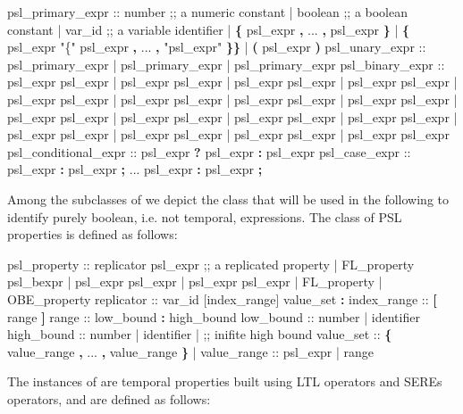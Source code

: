 \begin{Grammar}
psl_primary_expr ::
   number                              ;; a numeric constant
 | boolean                             ;; a boolean constant
 | var_id                              ;; a variable identifier
 | \textbf{\{} psl_expr \textbf{,} ... \textbf{,} psl_expr \textbf{\}}
 | \textbf{\{} psl_expr "\{" psl_expr \textbf{,} ... \textbf{,} "psl_expr" \textbf{\}}\textbf{\}}
 | \textbf{(} psl_expr \textbf{)}
psl_unary_expr ::
   \operator{+} psl_primary_expr     
 | \operator{-} psl_primary_expr  
 | \operator{!} psl_primary_expr  
psl_binary_expr ::
   psl_expr \operator{+} psl_expr    
 | psl_expr  psl_expr 
 | psl_expr  psl_expr 
 | psl_expr \operator{-} psl_expr   
 | psl_expr \operator{*}psl_expr   
 | psl_expr \operator{/} psl_expr   
 | psl_expr \operator{\%} psl_expr 
 | psl_expr \operator{==} psl_expr    
 | psl_expr \operator{!=} psl_expr  
 | psl_expr \operator{<} psl_expr       
 | psl_expr \operator{<=} psl_expr       
 | psl_expr \operator{>} psl_expr       
 | psl_expr \operator{>=} psl_expr       
 | psl_expr \operator{&} psl_expr 
 | psl_expr \operator{|} psl_expr 
 | psl_expr  psl_expr 
psl_conditional_expr ::
 psl_expr \textbf{?} psl_expr \textbf{:} psl_expr 
psl_case_expr ::
     psl_expr \textbf{:} psl_expr \textbf{;}
     ...
     psl_expr \textbf{:} psl_expr \textbf{;}
\end{Grammar}
%
Among the subclasses of  we depict the class
 that will be used in the following to identify purely
boolean, i.e. not temporal, expressions. The class of PSL properties
 is defined as follows:
%
\begin{Grammar}
psl_property :: 
   replicator psl_expr ;; a replicated property 
 | FL_property  psl_bexpr
 | psl_expr \operator{<->} psl_expr
 | psl_expr \operator{->} psl_expr
 | FL_property       
 | OBE_property      
replicator :: 
    var_id [index_range]  value_set \textbf{:} 
index_range :: 
   \textbf{[} range \textbf{]} 
range :: 
   low_bound \textbf{:} high_bound 
low_bound :: 
   number              
 | identifier         
high_bound :: 
   number 
 | identifier
 |              ;; inifite high bound 
value_set :: 
   \textbf{\{} value_range \textbf{,} ... \textbf{,} value_range \textbf{\}}
 | 
value_range :: 
   psl_expr
 | range
\end{Grammar}
%
The instances of  are temporal properties built
using LTL operators and SEREs operators, and are defined as follows:
%

